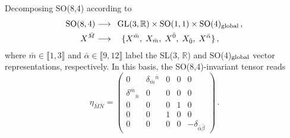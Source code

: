\documentclass[11pt]{article}
\newcommand{\bM}{{\bar{M}}}
\newcommand{\bN}{{\bar{N}}}
\newcommand{\bzero}{{\bar{0}}}
\newcommand{\balpha}{{\bar{\alpha}}}
\newcommand{\bbeta}{{\bar{\beta}}}
\begin{document}
Decomposing SO(8,4) according to 
%
\begin{equation}	\label{eq: gl3gradingbar}
	\begin{aligned}
		\text{SO}(8,4)	&\longrightarrow	\enspace \text{GL}(3,\mathbb{R})\times\text{SO}(1,1)\times\text{SO}(4)_{\rm global}\,,	\\
		X^{\bM}		&\longrightarrow	\quad \{X^{\bar m},\; X_{\bar m},\; X^\bzero,\; X_\bzero,\; X^\balpha\}\,,
	\end{aligned}
\end{equation}
where $\bar m\in\llbracket1,3\rrbracket$ and $\balpha\in\llbracket9,12\rrbracket$ label the SL(3, $\mathbb{R}$) and SO(4)$_{\rm global}$ vector representations, respectively. In this basis, the SO(8,4)-invariant tensor reads
%
\begin{equation}	\label{eq: Paulieta}
	\eta_{\bM\bN}=
	\begin{pmatrix}
		0 & \delta_{\bar m}{}^{\bar n} & 0 & 0 &0\\
		\delta^{\bar m}{}_{\bar n} & 0 & 0 & 0 &0\\
		0 & 0 & 0 & 1 & 0\\
		0 & 0 & 1 & 0 & 0\\
		0 & 0 & 0 & 0 & -\delta_{\balpha\bbeta}
	\end{pmatrix}\,.
\end{equation}
\end{document}
